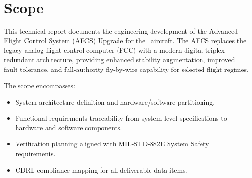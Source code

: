 \section{Scope}
This technical report documents the engineering development of the Advanced Flight
Control System (AFCS) Upgrade for the \aircraft\ aircraft. The AFCS replaces the
legacy analog flight control computer (FCC) with a modern digital triplex-redundant
architecture, providing enhanced stability augmentation, improved fault tolerance, and
full-authority fly-by-wire capability for selected flight regimes.

The scope encompasses:
\begin{itemize}
  \item System architecture definition and hardware/software partitioning.
  \item Functional requirements traceability from system-level specifications to
        hardware and software components.
  \item Verification planning aligned with MIL-STD-882E System Safety requirements.
  \item CDRL compliance mapping for all deliverable data items.
\end{itemize}
